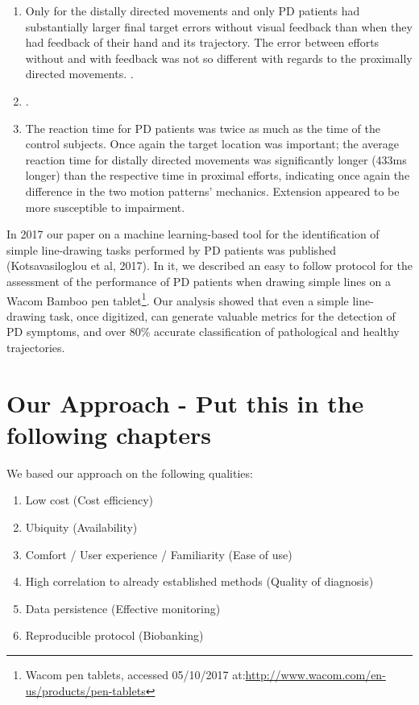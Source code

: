 \begin{enumerate}
\item Only for the distally directed movements and only \gls{PD} patients had substantially larger final target errors without visual feedback than when they had feedback of their hand and its trajectory. The error between efforts without and with feedback was not so different with regards to the proximally directed movements. . 
\item {}.
\item The reaction time for \gls{PD} patients was twice as much as the time of the control subjects. Once again the target location was important; the average reaction time for distally directed movements was significantly longer (433ms longer) than the respective time in proximal efforts, indicating once again the difference in the two motion patterns' mechanics. Extension appeared to be more susceptible to impairment.
\end{enumerate} 

In 2017 our paper on a machine learning-based tool for the identification of simple line-drawing tasks performed by PD patients was published (Kotsavasiloglou et al, 2017). In it, we described an easy to follow protocol for the assessment of the performance of PD patients when drawing simple lines on a Wacom Bamboo pen tablet\footnote{Wacom pen tablets, accessed 05/10/2017 at:\url{http://www.wacom.com/en-us/products/pen-tablets}}. Our analysis showed that even a simple line-drawing task, once digitized, can generate valuable metrics for the detection of PD symptoms, and over 80\% accurate classification of pathological and healthy trajectories. 

\section{Our Approach - Put this in the following chapters}
\label{sec:ourApproach}


We based our approach on the following qualities:

\begin{enumerate}
\item Low cost (Cost efficiency)
\item Ubiquity (Availability)
\item Comfort / User experience / Familiarity (Ease of use)
\item High correlation to already established methods (Quality of diagnosis)
\item Data persistence (Effective monitoring)
\item Reproducible protocol (Biobanking)
\end{enumerate}